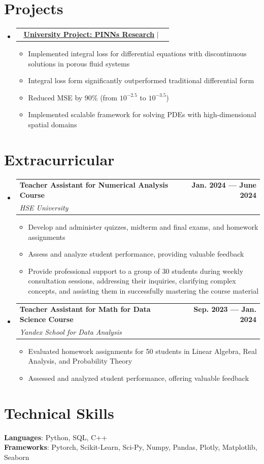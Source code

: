 \documentclass[letterpaper,11pt]{article}
\makeatletter
\newcommand{\resumeItem}[1]{
  \item\small{
    {#1 \vspace{-2pt}}
  }
}
\newcommand{\resumeSubheading}[4]{
  \vspace{-2pt}\item
    \begin{tabular*}{1.0\textwidth}[t]{l@{\extracolsep{\fill}}r}
      \textbf{#1} & \textbf{\small #2} \\
      \textit{\small#3} & \textit{\small #4} \\
    \end{tabular*}\vspace{-7pt}
}
\newcommand{\resumeProjectHeading}[2]{
    \item
    \begin{tabular*}{1.001\textwidth}{l@{\extracolsep{\fill}}r}
      \small#1 & \textbf{\small #2}\\
    \end{tabular*}\vspace{-7pt}
}
\newcommand{\resumeSubHeadingListStart}{\begin{itemize}[leftmargin=0.0in, label={}]}
\newcommand{\resumeSubHeadingListEnd}{\end{itemize}}
\newcommand{\resumeItemListStart}{\begin{itemize}}
\newcommand{\resumeItemListEnd}{\end{itemize}\vspace{-5pt}}
\makeatother
\begin{document}
\section{Projects}
    \resumeSubHeadingListStart
        \resumeProjectHeading{\textbf{\faGithub \, \href{https://github.com/tlidzhiev/pinn-project}{\underline{University Project: PINNs Research}}} $|$ \emph{}}{}
      \resumeItemListStart
        \resumeItem{Implemented integral loss for differential equations with discontinuous solutions in porous fluid systems}
        \resumeItem{Integral loss form significantly outperformed traditional differential form}
        \resumeItem{Reduced MSE by 90\% (from $10^{-2.5}$ to $10^{-3.5}$)}
        \resumeItem{Implemented scalable framework for solving PDEs with high-dimensional spatial domains}
      \resumeItemListEnd
  \resumeSubHeadingListEnd
\vspace{-16pt}

\section{Extracurricular}
    \resumeSubHeadingListStart
        \resumeSubheading{Teacher Assistant for Numerical Analysis Course}{Jan. 2024 --- June 2024}{HSE University}{}
            \resumeItemListStart
                \resumeItem{Develop and administer quizzes, midterm and final exams, and homework assignments}
                \resumeItem{Assess and analyze student performance, providing valuable feedback}
                \resumeItem{Provide professional support to a group of 30 students during weekly consultation sessions, addressing their inquiries, clarifying complex concepts, and assisting them in successfully mastering the course material}
            \resumeItemListEnd

        \resumeSubheading{Teacher Assistant for Math for Data Science Course}{Sep. 2023 --- Jan. 2024}{Yandex School for Data Analysis }{}
            \resumeItemListStart
                \resumeItem{Evaluated homework assignments for 50 students in Linear Algebra, Real Analysis, and Probability Theory}
                \resumeItem{Assessed and analyzed student performance, offering valuable feedback}
            \resumeItemListEnd
    \resumeSubHeadingListEnd

\section{Technical Skills}
 \begin{itemize}[leftmargin=0.15in, label={}]
    \small{\item{
     \textbf{Languages}{: Python, SQL, C++} \\
     \textbf{Frameworks}{: Pytorch, Scikit-Learn, Sci-Py, Numpy, Pandas, Plotly, Matplotlib, Seaborn} \\
    }}
 \end{itemize}
 \vspace{-16pt}
 
\end{document}
